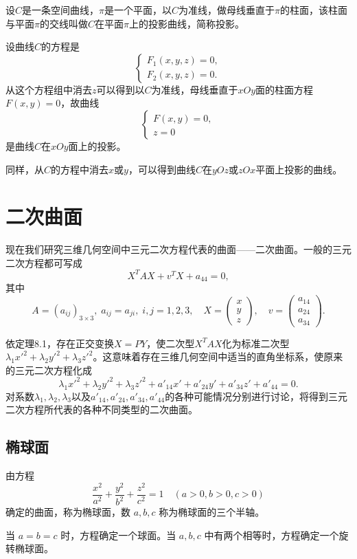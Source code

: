 设$C$是一条空间曲线，$\pi$是一个平面，以$C$为准线，做母线垂直于$\pi$的柱面，该柱面与平面$\pi$的交线叫做$C$在平面$\pi$上的投影曲线，简称投影。

设曲线$C$的方程是
\[
\begin{cases}
F_1(x,y,z)=0,\\
F_2(x,y,z)=0.
\end{cases}
\]
从这个方程组中消去$z$可以得到以$C$为准线，母线垂直于$xOy$面的柱面方程$F(x,y)=0$，故曲线
\[
\begin{cases}
F(x,y)=0,\\
z=0
\end{cases}
\]
是曲线$C$在$xOy$面上的投影。

同样，从$C$的方程中消去$x$或$y$，可以得到曲线$C$在$yOz$或$zOx$平面上投影的曲线。

\section{二次曲面}
现在我们研究三维几何空间中三元二次方程代表的曲面——二次曲面。一般的三元二次方程都可写成
\[
X^TAX+v^TX+a_{44}=0,
\]
其中
\[
A=(a_{ij})_{3\times3},\;a_{ij}=a_{ji},\;i,j=1,2,3,\quad
X=\begin{pmatrix}x\\y\\z\end{pmatrix},\quad
v=\begin{pmatrix}a_{14}\\a_{24}\\a_{34}\end{pmatrix}.
\]

依定理8.1，存在正交变换$X=PY$，使二次型$X^TAX$化为标准二次型$\lambda_1x'^2+\lambda_2y'^2+\lambda_3z'^2$。这意味着存在三维几何空间中适当的直角坐标系，使原来的三元二次方程化成
\[
\lambda_1x'^2+\lambda_2y'^2+\lambda_3z'^2+a'_{14}x'+a'_{24}y'+a'_{34}z'+a'_{44}=0.
\]
对系数$\lambda_1,\lambda_2,\lambda_3$以及$a'_{14},a'_{24},a'_{34},a'_{44}$的各种可能情况分别进行讨论，将得到三元二次方程所代表的各种不同类型的二次曲面。

\subsection{椭球面}
由方程
\[
\frac{x^2}{a^2} + \frac{y^2}{b^2} + \frac{z^2}{c^2} = 1 \quad (a > 0, b > 0, c > 0)
\]
确定的曲面，称为椭球面，数 $a, b, c$ 称为椭球面的三个半轴。

当 $a = b = c$ 时，方程确定一个球面。当 $a, b, c$ 中有两个相等时，方程确定一个旋转椭球面。

